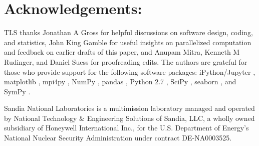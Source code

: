 \documentclass[aps,pra, twocolumn]{revtex4-1}
\begin{document}
\section{Acknowledgements:}
TLS thanks Jonathan A Gross for helpful discussions on software design, coding, and statistics, John King Gamble for useful insights on parallelized
computation and feedback on earlier drafts of this paper, and Anupam Mitra, Kenneth M Rudinger, and Daniel Suess for proofreading edits. The authors are grateful for those who provide support for the following software packages: iPython/Jupyter \cite{Perez}, matplotlib
\cite{Hunter2007}, mpi4py \cite{Dalcin2011},  NumPy \cite{VanDerWalt2011}, pandas \cite{mckinney2010}, Python 2.7 
\cite{vanRossum}, SciPy \cite{Oliphant2007a}, seaborn \cite{Waskom2016}, and SymPy \cite{Meurer2017}. 

Sandia National Laboratories is a multimission laboratory managed and operated by National Technology \& Engineering Solutions of Sandia, LLC, a wholly owned subsidiary of Honeywell International Inc., for the U.S. Department of Energy's National Nuclear Security Administration under contract DE-NA0003525.



\end{document}
